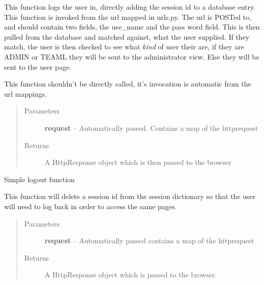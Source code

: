 \documentclass[letterpaper,10pt,english]{sphinxmanual}
\begin{document}

\begin{fulllineitems}
\label{code:timetracker.views.login}
This function logs the user in, directly adding the session id to
a database entry. This function is invoked from the url mapped in urls.py.
The url is POSTed to, and should contain two fields, the use\_name and the
pass word field. This is then pulled from the database and matched
against, what the user supplied. If they match, the user is then checked
to see what \emph{kind} of user their are, if they are ADMIN or TEAML they will
be sent to the administrator view. Else they will be sent to the user
page.

This function shouldn't be directly called, it's invocation is automatic
from the url mappings.
\begin{quote}\begin{description}
\item[{Parameters}] \leavevmode
\textbf{request} -- Automatically passed. Contains a map of the httprequest

\item[{Returns}] \leavevmode
A HttpResponse object which is then passed to the browser

\end{description}\end{quote}

\end{fulllineitems}


\begin{fulllineitems}
\label{code:timetracker.views.logout}
Simple logout function

This function will delete a session id from the session dictionary so that
the user will need to log back in order to access the same pages.
\begin{quote}\begin{description}
\item[{Parameters}] \leavevmode
\textbf{request} -- Automatically passed contains a map of the httprequest

\item[{Returns}] \leavevmode
A HttpResponse object which is passed to the browser.

\end{description}\end{quote}

\end{fulllineitems}
\end{document}

